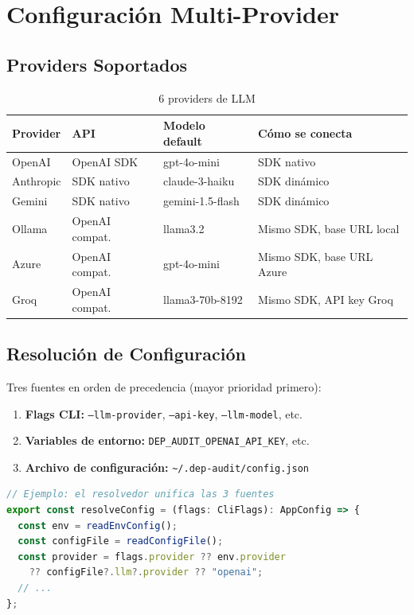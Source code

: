 \documentclass[11pt,a4paper]{article}
\begin{document}
\section{Configuración Multi-Provider}

\subsection{Providers Soportados}

\begin{table}[H]
  \centering
  \caption{6 providers de LLM}
  \begin{tabularx}{\textwidth}{l l l X}
    \toprule
    \textbf{Provider} & \textbf{API} & \textbf{Modelo default} & \textbf{Cómo se conecta} \\
    \midrule
    OpenAI & OpenAI SDK & gpt-4o-mini & SDK nativo \\
    Anthropic & SDK nativo & claude-3-haiku & SDK dinámico \\
    Gemini & SDK nativo & gemini-1.5-flash & SDK dinámico \\
    Ollama & OpenAI compat. & llama3.2 & Mismo SDK, base URL local \\
    Azure & OpenAI compat. & gpt-4o-mini & Mismo SDK, base URL Azure \\
    Groq & OpenAI compat. & llama3-70b-8192 & Mismo SDK, API key Groq \\
    \bottomrule
  \end{tabularx}
\end{table}

\subsection{Resolución de Configuración}

Tres fuentes en orden de precedencia (mayor prioridad primero):

\begin{enumerate}
  \item \textbf{Flags CLI:} \texttt{--llm-provider}, \texttt{--api-key}, \texttt{--llm-model}, etc.
  \item \textbf{Variables de entorno:} \texttt{DEP\_AUDIT\_OPENAI\_API\_KEY}, etc.
  \item \textbf{Archivo de configuración:} \texttt{\textasciitilde{}/.dep-audit/config.json}
\end{enumerate}

\begin{lstlisting}[language=TypeScript]
// Ejemplo: el resolvedor unifica las 3 fuentes
export const resolveConfig = (flags: CliFlags): AppConfig => {
  const env = readEnvConfig();
  const configFile = readConfigFile();
  const provider = flags.provider ?? env.provider
    ?? configFile?.llm?.provider ?? "openai";
  // ...
};
\end{lstlisting}
\end{document}
